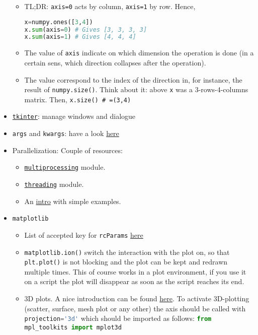 \documentclass[a4paper,12pt,%
              final%
              ]{article}
\begin{document}
\begin{itemize}
\begin{itemize}
      \item TL;DR: \verb|axis=0| acts by column, \verb|axis=1| by row. Hence,
\begin{lstlisting}[language=python]
x=numpy.ones([3,4])
x.sum(axis=0) # Gives [3, 3, 3, 3]
x.sum(axis=1) # Gives [4, 4, 4]
\end{lstlisting}
      \item The value of \texttt{axis} indicate on which dimension the operation is done (in a certain sens, which direction collapses after the operation).
      \item The value correspond to the index of the direction in, for instance, the result of \verb|numpy.size()|. Think about it: above \verb|x| was a 3-rows-4-columns matrix. Then, \verb|x.size() # =(3,4)|
    \end{itemize}
  \item \href{https://docs.python.org/3/library/tkinter.html}{\texttt{tkinter}}: manage windows and dialogue
  \item \texttt{args} and \texttt{kwargs}: have a look \href{https://realpython.com/python-kwargs-and-args/}{here}
  \item Parallelization: Couple of resources:
    \begin{itemize}
      \item \href{https://docs.python.org/3/library/multiprocessing.html}{\texttt{multiprocessing}} module.
      \item \href{https://docs.python.org/3/library/threading.html}{\texttt{threading}} module.
      \item An \href{https://www.machinelearningplus.com/python/parallel-processing-python/}{intro} with simple examples.
    \end{itemize}
  \item \texttt{matplotlib}
    \begin{itemize}
      \item List of accepted key for \texttt{rcParams} \href{https://matplotlib.org/stable/api/matplotlib_configuration_api.html#matplotlib.rcParams}{here}
      \item \texttt{matplotlib.ion()} switch the interaction with the plot on, so that \texttt{plt.plot()} is not blocking and the plot can be kept and redrawn multiple times. This of course works in a plot environment, if you use it on a script the plot will disappear as soon as the script reaches its end.
      \item 3D plots. A nice introduction can be found \href{https://jakevdp.github.io/PythonDataScienceHandbook/04.12-three-dimensional-plotting.html}{here}. To activate 3D-plotting (scatter, surface, mesh plot or any other) the axis should be called with \lstinline[language=python]{projection='3d'} which should be imported as follows: \lstinline[language=python]{from mpl_toolkits import mplot3d}

\end{itemize}
\end{itemize}
\end{document}
